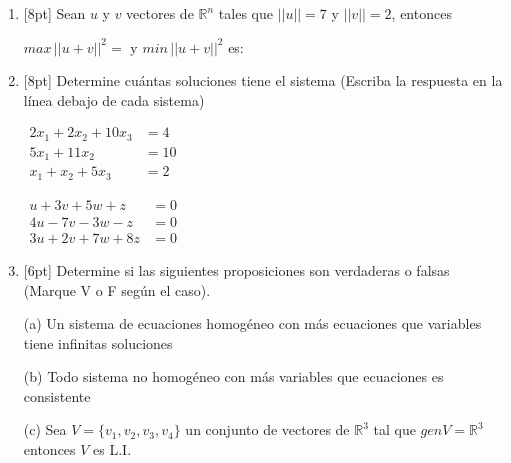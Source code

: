 \documentclass[11pt]{article}
\begin{document}
\begin{enumerate}
\item{}[8pt] Sean $u$ y $v$ vectores de $\mathbb{R}^n$ tales que $||u||=7$ y $||v||=2$, entonces

\vspace{4pt}
\noindent $max\,||u+v||^2 = $ \dotfill \hspace{1cm} y \hspace{0.3cm} $min\,||u+v||^2$ es: \dotfill

\item{}[8pt] Determine cuántas soluciones tiene el sistema (Escriba la respuesta en la línea debajo de cada sistema)

\vspace{6pt}
\noindent
\begin{minipage}[t]{0.46\linewidth}
$\begin{aligned}
2x_1+2x_2+10x_3 &=4\\
5x_1+11x_2 &=10\\
x_1+x_2+5x_3 &=2
\end{aligned}$

\vspace{4pt}
\dotfill
\end{minipage}%
\hfill
\begin{minipage}[t]{0.46\linewidth}
$\begin{aligned}
u+3v+5w+z &=0\\
4u-7v-3w-z &=0\\
3u+2v+7w+8z &=0
\end{aligned}$

\vspace{4pt}
\dotfill
\end{minipage}

\item{}[6pt] Determine si las siguientes proposiciones son verdaderas o falsas (Marque V o F según el caso).

\vspace{6pt}
\noindent (a) Un sistema de ecuaciones homogéneo con más ecuaciones que variables tiene infinitas soluciones \dotfill

\vspace{6pt}
\noindent (b) Todo sistema no homogéneo con más variables que ecuaciones es consistente \dotfill

\vspace{6pt}
\noindent (c) Sea $V=\{v_1,v_2,v_3,v_4\}$ un conjunto de vectores de $\mathbb{R}^3$ tal que $genV=\mathbb{R}^3$ entonces $V$ es L.I. \dotfill


\end{enumerate}
\end{document}

